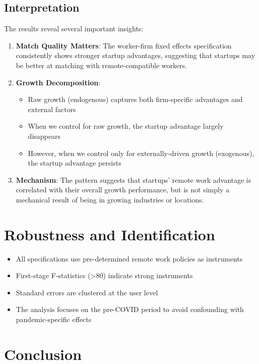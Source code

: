 \documentclass[11pt]{article}
\begin{document}
\subsection{Interpretation}

The results reveal several important insights:

\begin{enumerate}
\item \textbf{Match Quality Matters}: The worker-firm fixed effects specification consistently shows stronger startup advantages, suggesting that startups may be better at matching with remote-compatible workers.

\item \textbf{Growth Decomposition}: 
   \begin{itemize}
   \item Raw growth (endogenous) captures both firm-specific advantages and external factors
   \item When we control for raw growth, the startup advantage largely disappears
   \item However, when we control only for externally-driven growth (exogenous), the startup advantage persists
   \end{itemize}

\item \textbf{Mechanism}: The pattern suggests that startups' remote work advantage is correlated with their overall growth performance, but is not simply a mechanical result of being in growing industries or locations.
\end{enumerate}

\section{Robustness and Identification}

\begin{itemize}
\item All specifications use pre-determined remote work policies as instruments
\item First-stage F-statistics (>80) indicate strong instruments
\item Standard errors are clustered at the user level
\item The analysis focuses on the pre-COVID period to avoid confounding with pandemic-specific effects
\end{itemize}

\section{Conclusion}
\end{document}
